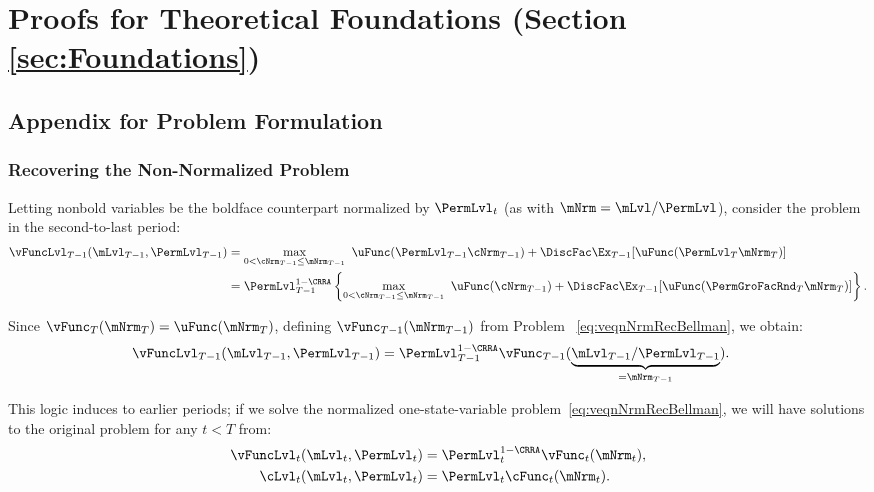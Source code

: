 \documentclass[\econtexRoot/BufferStockTheory]{subfiles}
\begin{document}
\section{Proofs for Theoretical Foundations (Section \ref{sec:Foundations})}

\subsection{Appendix for Problem Formulation}

\subsubsection{Recovering the Non-Normalized Problem}\label{sec:recoverLevels}
Letting nonbold variables be the boldface counterpart normalized by $\PermLvl_{t}$ (as with $\mNrm=\mLvl/\PermLvl$), consider the problem in the second-to-last period:
\begin{equation}\label{eq:vBold}
  \begin{split}
    \vFuncLvl_{T-1}(\mLvl_{T-1},\PermLvl_{T-1})
    & =  \max_{0< \cNrm_{T-1}\leq \mNrm_{T-1}}~
    \uFunc(\PermLvl_{T-1}\cNrm_{T-1}) + \DiscFac  \Ex_{T-1} [\uFunc(\PermLvl_{T}{\mNrm}
    _{T})]  \\
    & = \PermLvl_{T-1}^{1-\CRRA}
    \left\{\max_{0<\cNrm_{T-1}\leq \mNrm_{T-1}}~ \uFunc(\cNrm_{T-1}) + \DiscFac \Ex_{T-1} [ \uFunc( {\PermGroFacRnd}_{T}
      {\mNrm}_{T}) ] \right\}.
  \end{split}
\end{equation}

\hypertarget{The-Related-Problem}{}

Since $\vFunc_{T}(\mNrm_{T}) = \uFunc(\mNrm_{T})$, defining $\vFunc_{T-1}(\mNrm_{T-1})$ from Problem ~\eqref{eq:veqnNrmRecBellman}, we obtain:
\begin{align*}
  \vFuncLvl_{T-1}(\mLvl_{T-1},\PermLvl_{T-1})  & = \PermLvl_{T-1}^{1-\CRRA} \vFunc_{T-1}(\underbrace{\mLvl_{T-1}/\PermLvl_{T-1}}_{=\mNrm_{T-1}}).
\end{align*}

This logic induces to earlier periods; if we solve the normalized one-state-variable problem~\eqref{eq:veqnNrmRecBellman}, we will have solutions to the original problem for any $t<T$ from:
\begin{align*}
  \vFuncLvl_{t}(\mLvl_{t},\PermLvl_{t})  & = \PermLvl_{t}^{1-\CRRA}\vFunc_{t}(\mNrm_{t}),
  \\ \cLvl_{t}(\mLvl_{t},\PermLvl_{t})  & = \PermLvl_{t}\cFunc_{t}(\mNrm_{t}).
\end{align*}
\end{document}
